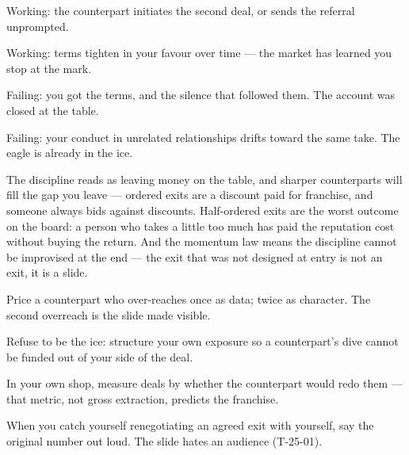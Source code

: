 \begin{feedback}
  \item Working: the counterpart initiates the second deal, or sends the referral unprompted.
  \item Working: terms tighten in your favour over time --- the market has learned you stop at the mark.
  \item Failing: you got the terms, and the silence that followed them. The account was closed at the table.
  \item Failing: your conduct in unrelated relationships drifts toward the same take. The eagle is already in the ice.
\end{feedback}
\begin{failure}
The discipline reads as leaving money on the table, and sharper counterparts will fill the gap you leave --- ordered exits are a discount paid for franchise, and someone always bids against discounts. Half-ordered exits are the worst outcome on the board: a person who takes a little too much has paid the reputation cost without buying the return. And the momentum law means the discipline cannot be improvised at the end --- the exit that was not designed at entry is not an exit, it is a slide.
\end{failure}
\begin{countermeasures}
  \item Price a counterpart who over-reaches once as data; twice as character. The second overreach is the slide made visible.
  \item Refuse to be the ice: structure your own exposure so a counterpart's dive cannot be funded out of your side of the deal.
  \item In your own shop, measure deals by whether the counterpart would redo them --- that metric, not gross extraction, predicts the franchise.
  \item When you catch yourself renegotiating an agreed exit with yourself, say the original number out loud. The slide hates an audience (T-25-01).
\end{countermeasures}

\seesources
{}
